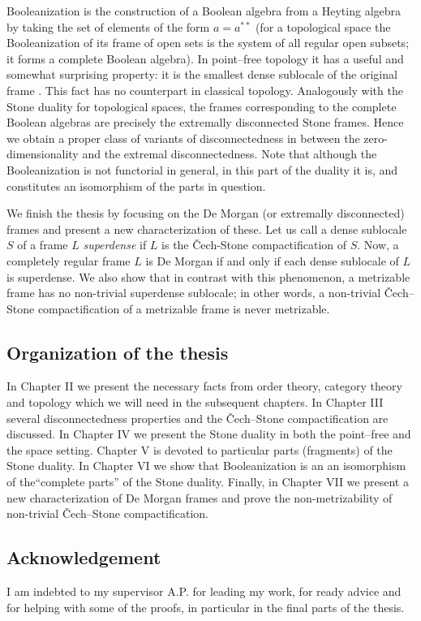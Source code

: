 \medskip

Booleanization is the construction of a Boolean algebra from a Heyting algebra by taking the set of elements of the form $a=a^{**}$ (for a topological space the Booleanization of its frame of open sets is the system of all regular open subsets; it forms a complete Boolean algebra). In point--free topology it has a useful and somewhat surprising property: it is the smallest dense sublocale of the original frame \cite{isbell1972atomless}. This fact has no counterpart in classical topology. 
Analogously with the Stone duality for topological spaces, the frames corresponding to the complete Boolean algebras are precisely the extremally disconnected Stone frames. Hence we obtain a proper class of variants of disconnectedness in between the zero-dimensionality and the extremal disconnectedness. Note that although the Booleanization is not functorial in general, in this part of the duality it is, and constitutes an isomorphism of the parts in question.

\medskip 

 We finish the thesis by focusing on the De Morgan (or extremally disconnected) frames and present a new
 characterization of these. Let  us call a dense  sublocale $S$ of a frame $L$ {\em superdense} if $L$ is the \v Cech-Stone compactification of $S$. Now, a completely regular frame $L$ is De Morgan  if and only if
 each dense sublocale of $L$ is superdense. We also show  that in contrast with this phenomenon, a metrizable frame has no non-trivial superdense sublocale; in other words, a non-trivial  \v Cech--Stone compactification of a metrizable frame is never metrizable.

\vskip10mm

\subsection*{Organization of the thesis}

In Chapter II we present the necessary facts from order theory, category theory and topology which we will need in the subsequent chapters. In Chapter III several disconnectedness properties and the \v Cech--Stone compactification are discussed. In Chapter IV we present the Stone duality in both the point--free and the space setting. Chapter  V is devoted to particular parts (fragments) of the Stone duality. In Chapter VI we show that Booleanization is an an isomorphism of the``complete parts'' of the Stone duality. Finally, in Chapter VII we present a new characterization of De Morgan frames and prove the non-metrizability of non-trivial \v Cech--Stone compactification.


\subsection*{Acknowledgement}

I am indebted to my supervisor A.P. for leading my work, for ready advice and for helping with some of the proofs, in particular in the final parts of the thesis.


